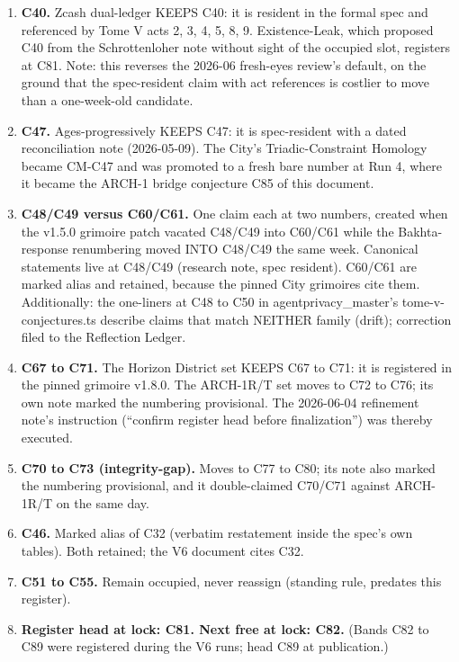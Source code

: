 \documentclass[
  11pt,
]{article}
\providecommand{\tightlist}{%
  \setlength{\itemsep}{0pt}\setlength{\parskip}{0pt}}
\begin{document}
\begin{enumerate}
\def\labelenumi{\arabic{enumi}.}
\tightlist
\item
  \textbf{C40.} Zcash dual-ledger KEEPS C40: it is resident in the
  formal spec and referenced by Tome V acts 2, 3, 4, 5, 8, 9.
  Existence-Leak, which proposed C40 from the Schrottenloher note
  without sight of the occupied slot, registers at C81. Note: this
  reverses the 2026-06 fresh-eyes review's default, on the ground that
  the spec-resident claim with act references is costlier to move than a
  one-week-old candidate.
\item
  \textbf{C47.} Ages-progressively KEEPS C47: it is spec-resident with a
  dated reconciliation note (2026-05-09). The City's Triadic-Constraint
  Homology became CM-C47 and was promoted to a fresh bare number at Run
  4, where it became the ARCH-1 bridge conjecture C85 of this document.
\item
  \textbf{C48/C49 versus C60/C61.} One claim each at two numbers,
  created when the v1.5.0 grimoire patch vacated C48/C49 into C60/C61
  while the Bakhta-response renumbering moved INTO C48/C49 the same
  week. Canonical statements live at C48/C49 (research note, spec
  resident). C60/C61 are marked alias and retained, because the pinned
  City grimoires cite them. Additionally: the one-liners at C48 to C50
  in agentprivacy\_master's tome-v-conjectures.ts describe claims that
  match NEITHER family (drift); correction filed to the Reflection
  Ledger.
\item
  \textbf{C67 to C71.} The Horizon District set KEEPS C67 to C71: it is
  registered in the pinned grimoire v1.8.0. The ARCH-1R/T set moves to
  C72 to C76; its own note marked the numbering provisional. The
  2026-06-04 refinement note's instruction (``confirm register head
  before finalization'') was thereby executed.
\item
  \textbf{C70 to C73 (integrity-gap).} Moves to C77 to C80; its note
  also marked the numbering provisional, and it double-claimed C70/C71
  against ARCH-1R/T on the same day.
\item
  \textbf{C46.} Marked alias of C32 (verbatim restatement inside the
  spec's own tables). Both retained; the V6 document cites C32.
\item
  \textbf{C51 to C55.} Remain occupied, never reassign (standing rule,
  predates this register).
\item
  \textbf{Register head at lock: C81. Next free at lock: C82.} (Bands
  C82 to C89 were registered during the V6 runs; head C89 at
  publication.)
\end{enumerate}
\end{document}
